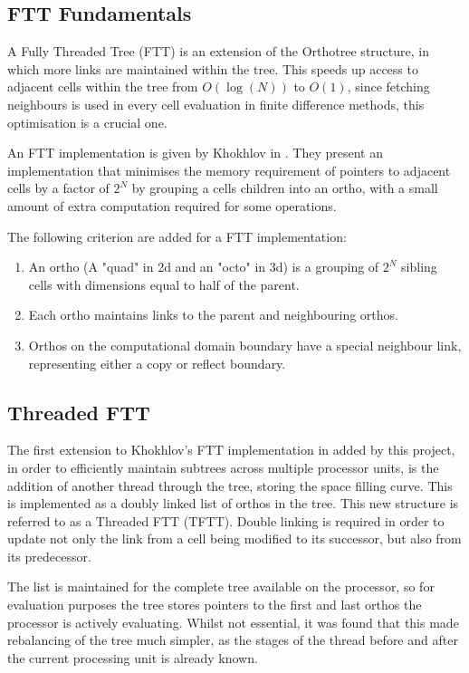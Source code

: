 \documentclass{IIBproject}
\begin{document}
\subsection{FTT Fundamentals}
A Fully Threaded Tree (FTT) is an extension of the Orthotree structure, in which more links are maintained within the tree. This speeds up access to adjacent cells within the tree from $O(\log(N))$ to $O(1)$, since fetching neighbours is used in every cell evaluation in finite difference methods, this optimisation is a crucial one. 

An FTT implementation is given by Khokhlov in \cite{Khokhlov98}. They present an implementation that minimises the memory requirement of pointers to adjacent cells by a factor of $2^N$ by grouping a cells children into an ortho, with a small amount of extra computation required for some operations. 

The following criterion are added for a FTT implementation:
\begin{enumerate}
	\item An ortho (A "quad" in 2d and an "octo" in 3d) is a grouping of $2^N$ sibling cells with dimensions equal to half of the parent.
	\item Each ortho maintains links to the parent and neighbouring orthos.
	\item Orthos on the computational domain boundary have a special neighbour link, representing either a copy or reflect boundary.
\end{enumerate}

\subsection{Threaded FTT}
The first extension to Khokhlov's FTT implementation in \cite{Khokhlov98} added by this project, in order to efficiently maintain subtrees across multiple processor units, is the addition of another thread through the tree, storing the space filling curve. This is implemented as a doubly linked list of orthos in the tree. This new structure is referred to as a Threaded FTT (TFTT). Double linking is required in order to update not only the link from a cell being modified to its successor, but also from its predecessor. 

The list is maintained for the complete tree available on the processor, so for evaluation purposes the tree stores pointers to the first and last orthos the processor is actively evaluating. Whilst not essential, it was found that this made rebalancing of the tree much simpler, as the stages of the thread before and after the current processing unit is already known.
\end{document}
